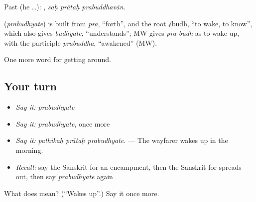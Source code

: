 Past (he …):   , \emph{saḥ prātaḥ prabuddhavān}.

\begin{cousinweb}
\textbf{} (\emph{prabudhyate}) is built from \emph{pra}, \textquotedblleft{}forth\textquotedblright{}, and the root √budh, \textquotedblleft{}to wake, to know\textquotedblright{}, which also gives \emph{budhyate}, \textquotedblleft{}understands\textquotedblright{}; MW gives \emph{pra-budh} as to wake up, with the participle \emph{prabuddha}, \textquotedblleft{}awakened\textquotedblright{} (MW).
\end{cousinweb}

\begin{grammarlens}[title={What you've built}]
One more word for getting around.
\end{grammarlens}

\subsection*{Your turn}
\begin{itemize}
\raggedright
  \item \emph{Say it:} \emph{prabudhyate}
  \item \emph{Say it:} \emph{prabudhyate}, once more
  \item \emph{Say it:} \emph{pathikaḥ prātaḥ prabudhyate.} — The wayfarer wakes up in the morning.
  \item \emph{Recall:} say the Sanskrit for an encampment, then the Sanskrit for spreads out, then say \emph{prabudhyate} again
\end{itemize}

\begin{tcolorbox}[breakable,colback=teal!4,colframe=teal!35!black,title={Before you move on}]
What does  mean? (\textquotedblleft{}Wakes up\textquotedblright{}.) Say it once more.
\end{tcolorbox}
